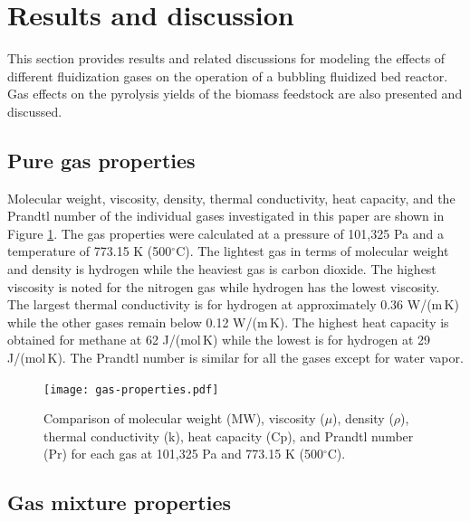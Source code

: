 
\section{Results and discussion}

This section provides results and related discussions for modeling the effects of different fluidization gases on the operation of a bubbling fluidized bed reactor. Gas effects on the pyrolysis yields of the biomass feedstock are also presented and discussed.


\subsection{Pure gas properties}

Molecular weight, viscosity, density, thermal conductivity, heat capacity, and the Prandtl number of the individual gases investigated in this paper are shown in Figure \ref{fig:gas-properties}. The gas properties were calculated at a pressure of 101,325 Pa and a temperature of 773.15 K (500$^\circ$C). The lightest gas in terms of molecular weight and density is hydrogen while the heaviest gas is carbon dioxide. The highest viscosity is noted for the nitrogen gas while hydrogen has the lowest viscosity. The largest thermal conductivity is for hydrogen at approximately 0.36 W/(m\,K) while the other gases remain below 0.12 W/(m\,K). The highest heat capacity is obtained for methane at 62 J/(mol\,K) while the lowest is for hydrogen at 29 J/(mol\,K). The Prandtl number is similar for all the gases except for water vapor.

\begin{figure}[H]
    \centering
    \texttt{[image: gas-properties.pdf]}
    \caption{Comparison of molecular weight (MW), viscosity ($\mu$), density ($\rho$), thermal conductivity (k), heat capacity (Cp), and Prandtl number (Pr) for each gas at 101,325 Pa and 773.15 K (500$^\circ$C).}
    \label{fig:gas-properties}
\end{figure}


\subsection{Gas mixture properties}

